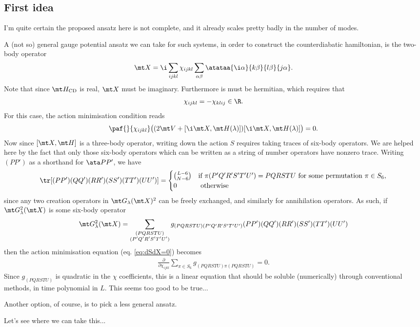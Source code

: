 \subsection{First idea}
{\color{red} I'm quite certain the proposed ansatz here is not complete, and it already scales pretty badly in the number of modes.}\par
A {\color{red}(not so)} general gauge potential ansatz we can take for such systems, in order to construct the counterdiabatic hamiltonian, is the two-body operator
\begin{align}
    \mt X = \i\sum_{ijkl} \chi_{ijkl} \sum_{\alpha\beta} \atataa{\i\alpha}{k\beta}{l\beta}{j\alpha}.
\end{align}
Note that since $\mt H_{\rm CD}$ is real, $\mt X$ must be imaginary. Furthermore is must be hermitian, which requires that
\begin{align}
    \chi_{ijkl} = -\chi_{klij} \in \R.
\end{align}
For this case, the action minimisation condition reads
\begin{align}
    \paf{}{\chi_{ijkl}} \big( ( 2\mt V + [\i\mt X, \mt H(\lambda)] ) [\i\mt X, \mt H(\lambda)] \big) = 0.
\end{align}
Now since $[\mt X, \mt H]$ is a three-body operator, writing down the action $S$ requires taking traces of six-body operators. We are helped here by the fact that only those six-body operators which can be written as a string of number operators have nonzero trace. Writing $(PP')$ as a shorthand for $\ata P{P'}$, we have
\begin{align}
    \tr[(PP')(QQ')(RR')(SS')(TT')(UU')] = \begin{cases}
        \binom{L - 6}{N - 6} & \text{if } \pi(P'Q'R'S'T'U') = PQRSTU \text{ for some permutation $\pi\in S_6$}, \\
        0 & \text{ otherwise}
    \end{cases}
\end{align}
since any two creation operators in $\mt G_\lambda(\mt X)^2$ can be freely exchanged, and similarly for annihilation operators.
As such, if $\mt G_\lambda^2(\mt X)$ is some six-body operator
\begin{align}
    \mt G_\lambda^2(\mt X) = \sum_{\substack{(PQRSTU) \\ (P'Q'R'S'T'U')}} g_{(PQRSTU)(P'Q'R'S'T'U')} (PP')(QQ')(RR')(SS')(TT')(UU')
\end{align}
then the action minimisation equation (eq. \ref{eq:dSdX=0}) becomes
\begin{align}
    \frac\partial{\partial \chi_{ijkl}} \sum_{\pi\in S_6} g_{(PQRSTU)\pi(PQRSTU)} = 0.
\end{align}
Since $g_{(PQRSTU)}$ is quadratic in the $\chi$ coefficients, this is a linear equation that should be soluble (numerically) through conventional methods, in time polynomial in $L$. This seems too good to be true...\par
Another option, of course, is to pick a less general ansatz.\par
Let's see where we can take this...

